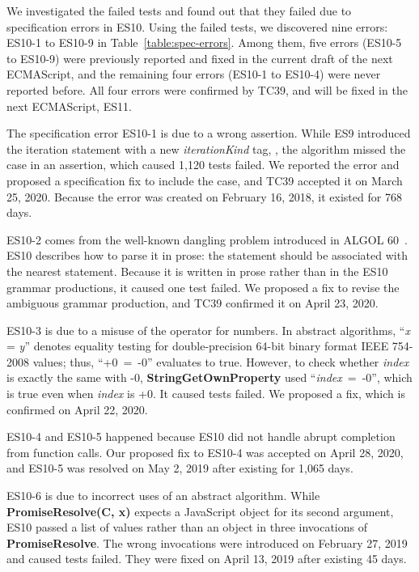 We investigated the failed tests and found out that they failed due to
specification errors in ES10.  Using the failed tests, we
discovered nine errors: ES10-1 to ES10-9 in
Table~\ref{table:spec-errors}.  Among them, five errors (ES10-5 to
ES10-9) were previously reported and fixed in the current draft of the
next ECMAScript, and the remaining four errors (ES10-1 to ES10-4) were
never reported before.  All four errors were confirmed by TC39, and
will be fixed in the next ECMAScript, ES11.

The specification error ES10-1 is due to a wrong assertion.
While ES9 introduced the  iteration statement with a
new {\it iterationKind} tag, , the
 algorithm missed the
 case in an assertion, which caused 1,120
tests failed.  We reported the error and proposed a specification fix
to include  the  case, and TC39 accepted it on
March 25, 2020.  Because the error was created on February 16, 2018,
it existed for 768 days.

ES10-2 comes from the well-known dangling  problem
introduced in ALGOL 60~\cite{dangling-else}.  ES10 describes how to
parse it in prose: the  statement should be associated with
the nearest  statement.  Because it is written in prose
rather than in the ES10 grammar productions, it caused one test
failed.  We proposed a fix to revise the ambiguous grammar production,
and TC39 confirmed it on April 23, 2020.

ES10-3 is due to a misuse of the \code{=} operator for numbers.
In abstract algorithms, ``{\it x} = {\it y}'' denotes equality testing
for double-precision 64-bit binary format IEEE 754-2008 values;
thus, \mbox{``+0 = -0''} evaluates to true.  However, to check whether
{\it index} is exactly the same with -0,
{\bf StringGetOwnProperty} used \mbox{``{\it index} = -0''},
which is true even when {\it index} is +0.
It caused  tests failed.  We proposed a fix, which is
confirmed on April 22, 2020.

ES10-4 and ES10-5 happened because ES10 did not handle
abrupt completion from function calls.  Our proposed fix to ES10-4 was
accepted on April 28, 2020, and ES10-5 was resolved on May 2, 2019
after existing for 1,065 days.

ES10-6 is due to incorrect uses of an abstract algorithm.
While {\bf PromiseResolve(C, x)} expects a JavaScript object for its
second argument, ES10 passed a list of values rather than an object in
three invocations of {\bf PromiseResolve}.  The wrong invocations were
introduced on February 27, 2019 and caused  tests failed.
They were fixed on April 13, 2019 after existing 45 days.

